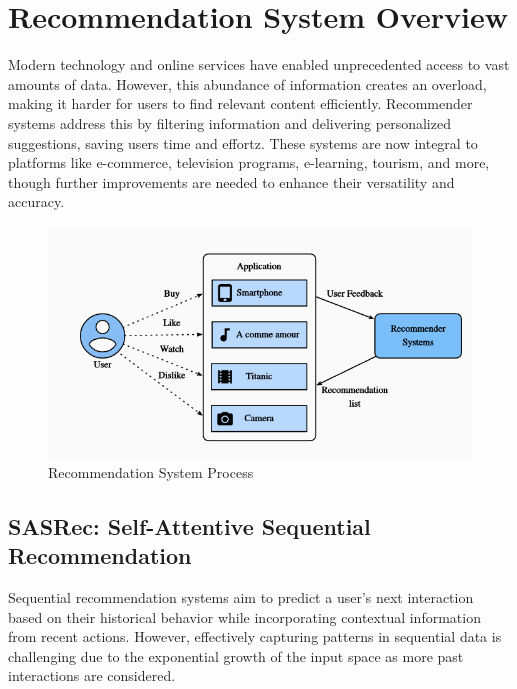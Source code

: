 \section{Recommendation System Overview}
Modern technology and online services have enabled unprecedented access to vast amounts of data. However, this abundance of information creates an overload, making it harder for users to find relevant content efficiently. Recommender systems address this by filtering information and delivering personalized suggestions, saving users time and effortz\cite{Roy2022}. These systems are now integral to platforms like e-commerce, television programs\cite{5174476}, e-learning\cite{WANG201110831}, tourism, and more, though further improvements are needed to enhance their versatility and accuracy.
\begin{figure}[ht]
	\centering
	\includegraphics[width=0.5\linewidth]{Figures/RS.png}
	\caption{Recommendation System Process}
	\label{Recommendation_System _Process}	
\end{figure}
\subsection{SASRec: Self-Attentive Sequential Recommendation}
Sequential recommendation systems aim to predict a user’s next interaction based on their historical behavior while incorporating contextual information from recent actions. However, effectively capturing patterns in sequential data is challenging due to the exponential growth of the input space as more past interactions are considered.\cite{kang2018selfat}

